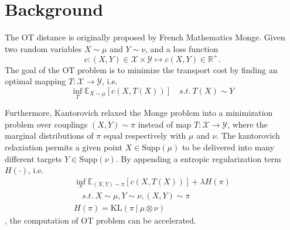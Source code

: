 \section{Background}

The OT distance is originally proposed by French Mathematics Monge. 
Given two random variables 
$X \sim \mu$ and $Y \sim \nu$, 
and a loss function
\begin{equation}
    c: (X, Y) \in  
    \mathscr{X} \times \mathscr{Y}
    \mapsto 
    c(X, Y) \in \mathbb{R}^+
    .
\end{equation}
The goal of the OT problem is to minimize the transport cost 
by finding an optimal mapping 
$T: \mathscr{X} \to \mathscr{Y}$, i.e.
\begin{equation}
    \inf_{T} \mathbb{E}_{X \sim \mu}
    \left[
        c\left( X, T(X) \right)
    \right]
    \quad s.t. \ 
    T(X) \sim Y
\end{equation}

Furthermore, Kantorovich relaxed the Monge problem into a minimization
problem over couplings 
$(X, Y) \sim \pi$ instead of map $T: \mathscr{X} \to \mathscr{Y}$,
where the marginal distributions of $\pi$ equal respectively 
with $\mu$ and $\nu$. 
The kantorovich relaxiation permits a given point 
$X \in \text{Supp}(\mu)$
to be delivered into many different targets
$Y \in \text{Supp}(\nu)$.
By appending a entropic regularization term 
$H(\cdot)$, i.e.
\begin{equation}
\begin{split}
    \inf_{\pi} \mathbb{E}_{(X,Y) \sim \pi}
    \left[
        c\left( X, T(X) \right)
    \right] + \lambda H(\pi)
    \\
    \quad s.t. \ 
    X \sim \mu, Y \sim \nu, (X, Y) \sim \pi
    \\
    H(\pi) = \text{KL}(\pi\ |\ \mu \otimes \nu)
\end{split}
\end{equation}
, the computation of OT problem can be accelerated.

